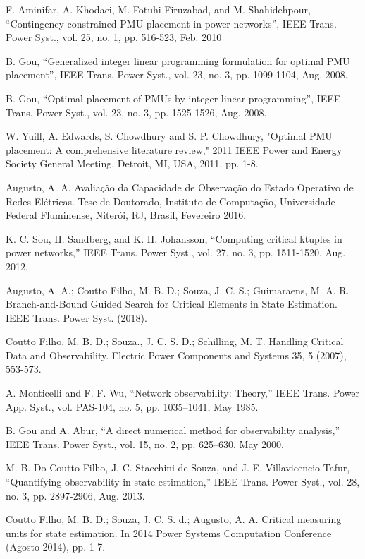 \documentclass[12pt]{article}
\begin{document}
\begin{thebibliography}{99}
	 F. Aminifar, A. Khodaei, M. Fotuhi-Firuzabad, and M. Shahidehpour, “Contingency-constrained PMU placement in power networks”, IEEE Trans. Power Syst., vol. 25, no. 1, pp. 516-523, Feb. 2010
	
	 B. Gou, “Generalized integer linear programming formulation for optimal PMU placement”, IEEE Trans. Power Syst., vol. 23, no. 3, pp. 1099-1104, Aug. 2008.
	
	 B. Gou, “Optimal placement of PMUs by integer linear programming”, IEEE Trans. Power Syst., vol. 23, no. 3, pp. 1525-1526, Aug. 2008.
	
	 W. Yuill, A. Edwards, S. Chowdhury and S. P. Chowdhury, "Optimal PMU placement: A comprehensive literature review," 2011 IEEE Power and Energy Society General Meeting, Detroit, MI, USA, 2011, pp. 1-8.
	
	 Augusto, A. A. Avaliação da Capacidade de Observação do Estado Operativo de Redes Elétricas. Tese de Doutorado, Instituto de Computação, Universidade Federal Fluminense, Niterói, RJ, Brasil, Fevereiro 2016.
	
	 K. C. Sou, H. Sandberg, and K. H. Johansson, “Computing critical ktuples in power networks,” IEEE Trans. Power Syst., vol. 27, no. 3, pp.
	1511-1520, Aug. 2012.
	
	 Augusto, A. A.; Coutto Filho, M. B. D.; Souza, J. C. S.; Guimaraens, M.
	A. R. Branch-and-Bound Guided Search for Critical Elements in State Estimation.
	IEEE Trans. Power Syst. (2018).
	
	 Coutto Filho, M. B. D.; Souza., J. C. S. D.; Schilling, M. T. Handling
	Critical Data and Observability. Electric Power Components and Systems 35, 5
	(2007), 553-573.
	
	A. Monticelli and F. F. Wu, “Network observability: Theory,” IEEE Trans. Power App. Syst., vol. PAS-104, no. 5, pp. 1035–1041, May 1985.
	
	 B. Gou and A. Abur, “A direct numerical method for observability analysis,” IEEE Trans. Power Syst., vol. 15, no. 2, pp. 625–630, May 2000.

	
	M. B. Do Coutto Filho, J. C. Stacchini de Souza, and J. E. Villavicencio Tafur, “Quantifying observability in state estimation,” IEEE Trans. Power Syst., vol. 28, no. 3, pp. 2897-2906, Aug. 2013.
	
	 Coutto Filho, M. B. D.; Souza, J. C. S. d.; Augusto, A. A. Critical measuring units for state estimation. In 2014 Power Systems Computation Conference
	(Agosto 2014), pp. 1-7.


\end{thebibliography}
\end{document}
